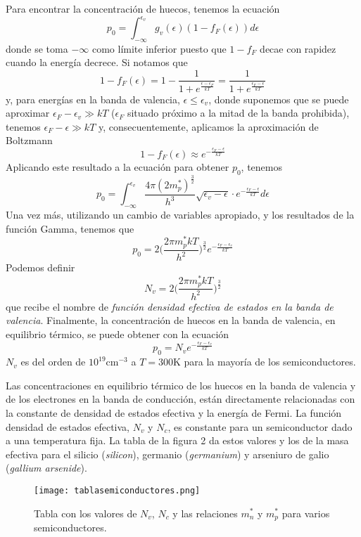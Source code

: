 \documentclass[12pt,a4paper]{article}
\begin{document}
Para encontrar la concentración de huecos, tenemos la ecuación
\[ p_{0} = \int _{- \infty}^{\epsilon _{v}} g_{v}(\epsilon) (1-f_{F}(\epsilon)) d\epsilon \]
donde se toma $-\infty$ como límite inferior puesto que $1-f_{F}$ decae con rapidez cuando la energía decrece. Si notamos que
\[ 1-f_{F}(\epsilon) = 1- \frac{1}{1+e^{\frac{\epsilon - \epsilon _{F}}{kT}}} = \frac{1}{1+e^{\frac{\epsilon _{F} - \epsilon}{kT}}} \]
y, para energías en la banda de valencia, $\epsilon \leq \epsilon _{v}$, donde suponemos que se puede aproximar $\epsilon _{F} - \epsilon _{v} \gg kT$ ($\epsilon _{F}$ situado próximo a la mitad de la banda prohibida), tenemos $\epsilon _{F} - \epsilon \gg kT$ y, consecuentemente, aplicamos la aproximación de Boltzmann
\[ 1 - f_{F}(\epsilon) \approx e^{-\frac{\epsilon _{F} - \epsilon}{kT}} \]
Aplicando este resultado a la ecuación para obtener $p_{0}$, tenemos
\[ p_{0} = \int _{-\infty}^{\epsilon _{v}} \frac{4 \pi (2m_{p}^{\ast})^{\frac{3}{2}}}{h^{3}} \sqrt{\epsilon _{v} - \epsilon} \cdot e^{-\frac{\epsilon _{F} - \epsilon}{kT}} d\epsilon \]
Una vez más, utilizando un cambio de variables apropiado, y los resultados de la función Gamma, tenemos que
\[ p_{0} = 2 \bigg( \frac{2 \pi m_{p}^{\ast}kT}{h^{2}} \bigg)^{\frac{3}{2}} e^{-\frac{\epsilon _{F} - \epsilon _{v}}{kT}} \]
Podemos definir
\[ N_{v} = 2 \bigg( \frac{2 \pi m_{p}^{\ast}kT}{h^{2}} \bigg)^{\frac{3}{2}} \]
que recibe el nombre de \emph{función densidad efectiva de estados en la banda de valencia}. Finalmente, la concentración de huecos en la banda de valencia, en equilibrio térmico, se puede obtener con la ecuación
\[ p_{0} = N_{v} e^{-\frac{\epsilon _{F} - \epsilon _{v}}{kT}} \]
$N_{v}$ es del orden de $10^{19} \textrm{cm}^{-3}$ a $T=300$K para la mayoría de los semiconductores.

Las concentraciones en equilibrio térmico de los huecos en la banda de valencia y de los electrones en la banda de conducción, están directamente relacionadas con la constante de densidad de estados efectiva y la energía de Fermi. La función densidad de estados efectiva, $N_{v}$ y $N_{c}$, es constante para un semiconductor dado a una temperatura fija. La tabla de la figura 2 da estos valores y los de la masa efectiva para el silicio (\emph{silicon}), germanio (\emph{germanium}) y arseniuro de galio (\emph{gallium arsenide}).

\begin{figure}[ht!]
\begin{center}
\texttt{[image: tablasemiconductores.png]}
\caption{Tabla con los valores de $N_{v}$, $N_{c}$ y las relaciones $m_{n}^{\ast}$ y $m_{p}^{\ast}$ para varios semiconductores.}
\end{center}
\end{figure}
\end{document}

